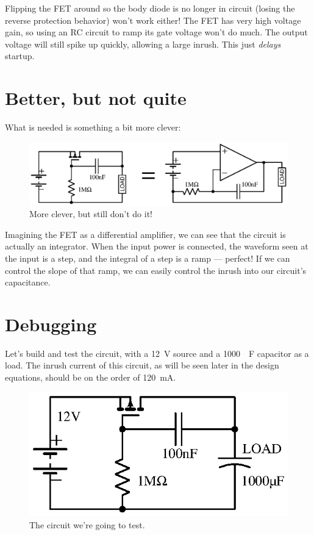 \documentclass[letterpaper,12pt]{article}
\begin{document}
Flipping the FET around so the body diode is no longer in circuit (losing the reverse protection
behavior) won't work either! The FET has very high voltage gain, so using an RC circuit to
ramp its gate voltage won't do much. The output voltage will still spike up quickly, allowing
a large inrush. This just \emph{delays} startup.

\section{Better, but not quite}
\label{sec:better}

What is needed is something a bit more clever:

\begin{figure}[H]
\centering
\includegraphics{what_not_to_do_2}
\caption{More clever, but still don't do it!}
\end{figure}

Imagining the FET as a differential amplifier, we can see that the circuit is actually
an integrator. When the input power is connected, the waveform seen at the input is a
step, and the integral of a step is a ramp --- perfect! If we can control the slope of
that ramp, we can easily control the inrush into our circuit's capacitance.

\section{Debugging}
\label{sec:debugging}

Let's build and test the circuit, with a \SI{12}{V} source and a
\SI{1000}{\mu F} capacitor as a load. The
inrush current of this circuit, as will be seen later in the design equations, should
be on the order of \SI{120}{mA}.

\begin{figure}[H]
\centering
\includegraphics{what_not_to_do_3}
\caption{The circuit we're going to test.}
\end{figure}
\end{document}
